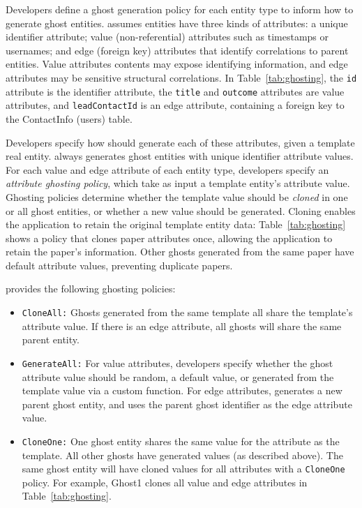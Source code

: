 Developers define a ghost generation policy for each entity type to
inform \sys how to generate ghost entities.
\sys assumes entities have three kinds of attributes: a unique identifier attribute; value
(non-referential) attributes such as timestamps or usernames; and edge (foreign key)
attributes that identify correlations to parent entities.  Value attributes contents may expose
identifying information, and edge attributes may be sensitive structural correlations.
In Table~\ref{tab:ghosting}, the \texttt{id} attribute is the identifier attribute, the
\texttt{title} and \texttt{outcome} attributes are value attributes, and \texttt{leadContactId} is
an edge attribute, containing a foreign key to the ContactInfo (users) table. 

Developers specify how \sys should generate each of these attributes, given a template real
entity.
\sys always generates ghost entities with unique identifier attribute values.
For each value and edge attribute of each entity type, developers specify an \emph{attribute ghosting policy},
which take as input a template entity's attribute value. Ghosting policies determine whether the
template value should be \emph{cloned} in one or all ghost entities, or whether
a new value should be generated. Cloning enables the application to retain
the original template entity data: Table~\ref{tab:ghosting} shows a policy that clones
paper attributes once, allowing the application to retain the paper's information. Other ghosts
generated from the same paper have default attribute values, preventing duplicate papers.

\sys provides the following ghosting policies:
\begin{itemize}
    \item \texttt{CloneAll:} Ghosts generated from the same template all share the template's 
        attribute value. If there is an edge attribute, all ghosts will share the
        same parent entity.

    \item \texttt{GenerateAll:} 
        For value attributes, developers specify whether the ghost attribute value should be
        random, a default value, or generated from the template value via a custom function.
        For edge attributes, \sys generates a new parent ghost entity, and uses the parent ghost
        identifier as the edge attribute value.

    \item \texttt{CloneOne:} One ghost entity shares the same value for the attribute as the
        template. All other ghosts have generated values (as described above).
        The same ghost entity will have cloned values for all attributes with a
        \texttt{CloneOne} policy. For example, Ghost1 clones all value and edge attributes in Table~\ref{tab:ghosting}.
\end{itemize}

